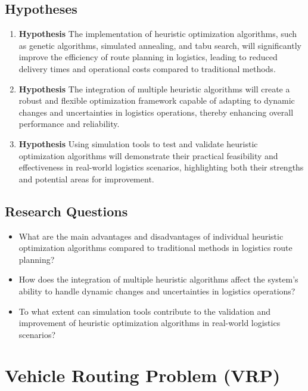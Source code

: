 \documentclass{article}
\begin{document}
    \subsection{Hypotheses}\label{subsec:hypotheses}
    \begin{enumerate}
        \item \textbf{Hypothesis } The implementation of heuristic optimization algorithms, such as genetic algorithms, simulated annealing, and tabu search, will significantly improve the efficiency of route planning in logistics, leading to reduced delivery times and operational costs compared to traditional methods.
        \item \textbf{Hypothesis } The integration of multiple heuristic algorithms will create a robust and flexible optimization framework capable of adapting to dynamic changes and uncertainties in logistics operations, thereby enhancing overall performance and reliability.
        \item \textbf{Hypothesis } Using simulation tools to test and validate heuristic optimization algorithms will demonstrate their practical feasibility and effectiveness in real-world logistics scenarios, highlighting both their strengths and potential areas for improvement.
    \end{enumerate}

    \subsection{Research Questions}\label{subsec:research_questions}
    \begin{itemize}
        \item What are the main advantages and disadvantages of individual heuristic optimization algorithms compared to traditional methods in logistics route planning?
        \item How does the integration of multiple heuristic algorithms affect the system's ability to handle dynamic changes and uncertainties in logistics operations?
        \item To what extent can simulation tools contribute to the validation and improvement of heuristic optimization algorithms in real-world logistics scenarios?
    \end{itemize}


    \newpage


    \section{Vehicle Routing Problem (VRP)}\label{vehicle-routing-problem}
\end{document}
